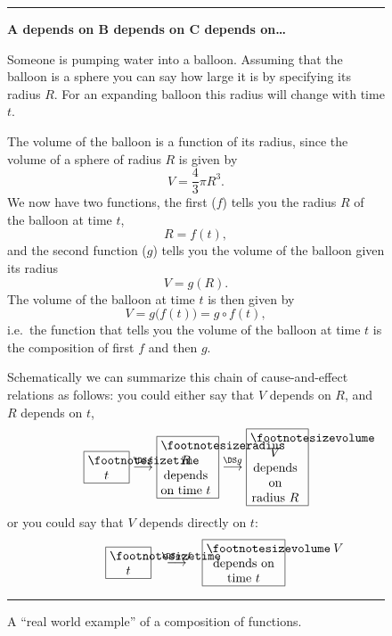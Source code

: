\begin{figure}[t]

  \noindent\rule{\textwidth}{1pt}

  \begin{minipage}[b]{\textwidth}\sffamily\color{darkbluegreen}
    \setlength{\parindent}{1pc}
    \rule{0pt}{12pt}\centerline{\sffamily\bfseries%
      A depends on B depends on C depends on\ldots}
    \begin{multicols}{2}
      \noindent\small%
      Someone is pumping water into a balloon.  Assuming that the balloon is a
      sphere you can say how large it is by specifying its radius $R$.  For an
      expanding balloon this radius will change with time $t$.

      The volume of the balloon is a function of its radius, since the
      volume of a sphere of radius $R$ is given by
      \[ V=\frac43\pi
      R^3.\]
      We now have two functions, the first ($f$) tells
      you the radius $R$ of the balloon at time $t$,
      \[
        R=f(t),
      \]
      and the second function ($g$) tells you the volume of the balloon given
      its radius
      \[
        V=g(R). 
      \]
      The volume of the balloon at time $t$ is then given by
      \[
        V=g\bigl(f(t)\bigr) = g\circ f(t),
      \]
      i.e.\ the function that tells you the volume of the balloon at time $t$
      is the composition of first $f$ and then $g$.

      Schematically we can summarize this chain of cause-and-effect relations as
      follows: you could either say that $V$ depends on $R$, and $R$ depends on
      $t$,
      \[
      \text{\framebox{\parbox{3em}{\centering\footnotesize%
              time $t$}}}
      \stackrel{\DS f}{\longrightarrow}
      \text{\framebox{\parbox{4em}{\centering\footnotesize%
      radius $R$\\
      depends on time $t$} }}
      \stackrel{\DS g}{\longrightarrow}
      \text{\framebox{\parbox{4em}{\centering\footnotesize%
      volume $V$\\ depends on radius $R$} }}
      \]
      or you could say that $V$ depends directly on $t$:
      \[
      \text{\framebox{\parbox{3em}{\centering\footnotesize%
              time $t$}}} \; \;
      \stackrel{\DS g\circ f}{\longrightarrow }\; \;
      \text{\framebox{\parbox{6em}{\centering\footnotesize%
      volume~$V$\\ depends on\\ time $t$}}}
      \]
    \end{multicols}

    \rule{0pt}{6pt}

  \end{minipage}

  \noindent\rule{\textwidth}{1pt}

  \caption{A ``real world example'' of a composition of functions.}
  \label{fig:04growing-balloon}
\end{figure}

